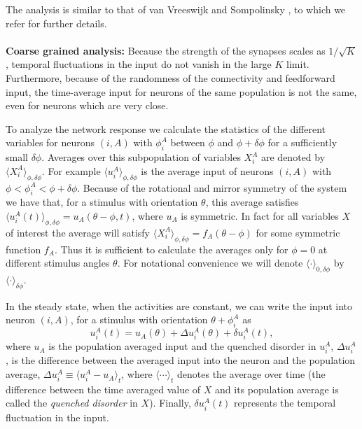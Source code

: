 The analysis is similar to that of van Vreeswijk and Sompolinsky 
\cite{vanVreeswijk2005}, to which we refer for further details.\\
 \\
{\noindent \bf Coarse grained analysis:}
Because the strength of the synapses scales as $1/\sqrt{K}$, temporal 
fluctuations in the input do not vanish in the large $K$ limit. 
Furthermore, because  of the randomness of the connectivity and feedforward 
input, the time-average input for neurons of the same population is not the 
same, even for neurons which are very close. 
 
To analyze the network response we calculate the statistics of the different
variables for neurons $(i,A)$ with $\phi_i^A$ between $\phi$ and
$\phi+\delta\phi$ for a sufficiently small $\delta\phi$\@. Averages over this
subpopulation of variables $X_i^A$ are denoted by $\langle X_i^A
\rangle_{\phi,\delta\phi}$\@. For example $\langle u_i^A
\rangle_{\phi,\delta\phi}$ is the average input of neurons $(i,A)$ with 
$\phi<\phi_i^A<\phi+\delta\phi$\@. Because of the rotational and mirror 
symmetry of the system we have that, for a stimulus with orientation 
$\theta$, this average satisfies $\langle u_i^A(t)\rangle_{\phi,\delta\phi}=
u_A(\theta-\phi,t)$, where $u_A$ is symmetric. In fact for all variables $X$ of 
interest the average will satisfy $\langle X_i^A \rangle_{\phi,\delta \phi}=f_A
(\theta-\phi)$ for some symmetric function $f_A$. Thus it is sufficient to 
calculate the averages only for $\phi=0$ at different stimulus angles 
$\theta$\@. For notational convenience we will denote $\langle \cdot 
\rangle_{0,\delta \phi}$ by $\langle \cdot \rangle_{\delta \phi}$\@.

In the steady state, when the activities are constant, we can write the input into
neuron $(i,A)$, for a stimulus with orientation $\theta+\phi_i^A$ as
\begin{equation}
u_i^A(t)=u_{A}(\theta)+\Delta u_i^{A}(\theta)+\delta u_i^{A}(t),
\label{input_terms:eq}
\end{equation}
where $u_{A}$ is the population averaged input and the quenched disorder in $u_i^A$,
$\Delta u_i^{A}$, is the
difference between the averaged input into the neuron and the population 
average, $\Delta u_i^{A}\equiv \langle u_i^A-u_A\rangle_t$, where
$\langle\cdots\rangle_t$ denotes the average over time (the difference
between the time averaged value of $X$ and its population average is 
called the {\it quenched disorder} in $X$\@).
Finally, $\delta u_i^{A}(t)$ represents the temporal fluctuation in the input.

